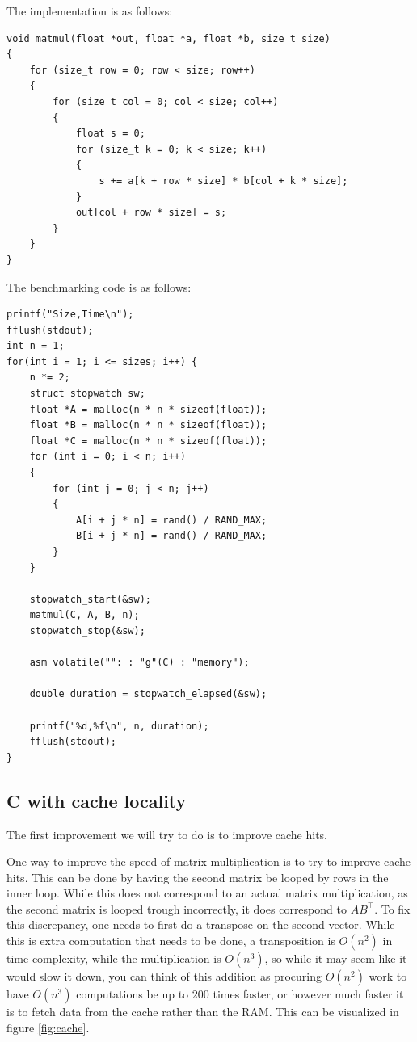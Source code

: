 \documentclass{article}
\begin{document}
The implementation is as follows:

\begin{verbatim}
void matmul(float *out, float *a, float *b, size_t size)
{
	for (size_t row = 0; row < size; row++)
	{
		for (size_t col = 0; col < size; col++)
		{
			float s = 0;
			for (size_t k = 0; k < size; k++)
			{
				s += a[k + row * size] * b[col + k * size];
			}
			out[col + row * size] = s;
		}
	}
}
\end{verbatim}

\newpage

The benchmarking code is as follows:

\begin{verbatim}
printf("Size,Time\n");
fflush(stdout);
int n = 1;
for(int i = 1; i <= sizes; i++) {
	n *= 2;
	struct stopwatch sw;
	float *A = malloc(n * n * sizeof(float));
	float *B = malloc(n * n * sizeof(float));
	float *C = malloc(n * n * sizeof(float));
	for (int i = 0; i < n; i++)
	{
		for (int j = 0; j < n; j++)
		{
			A[i + j * n] = rand() / RAND_MAX;
			B[i + j * n] = rand() / RAND_MAX;
		}
	}

	stopwatch_start(&sw);
	matmul(C, A, B, n);
	stopwatch_stop(&sw);

	asm volatile("": : "g"(C) : "memory");

	double duration = stopwatch_elapsed(&sw);

	printf("%d,%f\n", n, duration);
	fflush(stdout);
}
\end{verbatim}

\subsection{C with cache locality}

The first improvement we will try to do is to improve cache hits.

One way to improve the speed of matrix multiplication is to try to improve cache hits.
This can be done by having the second matrix be looped by rows in the inner loop.
While this does not correspond to an actual matrix multiplication, as the second matrix is looped trough incorrectly, it does
correspond to $AB^\top$. To fix this discrepancy, one needs to first do a transpose on the second vector.
While this is extra computation that needs to be done, a transposition is $O(n^2)$ in time complexity, while the multiplication
is $O(n^3)$, so while it may seem like it would slow it down, you can think of this addition as procuring $O(n^2)$ work to have
$O(n^3)$ computations be up to $200$ times faster, or however much faster it is to fetch data from the cache rather than the RAM.
This can be visualized in figure \ref{fig:cache}.
\end{document}
